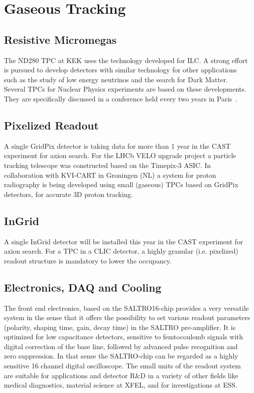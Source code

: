 \section{Gaseous Tracking}
\subsection{Resistive Micromegas}
The ND280 TPC at KEK uses the technology developed for ILC.
A strong effort is pursued to develop detectors with similar technology for other applications such as
the study of low energy neutrinos and the search for Dark Matter.
Several TPCs for Nuclear Physics experiments are based on these developments. They are specifically discussed in a
conference held every two years in Paris~\cite{Irastorza:2013mxa}.

\subsection{Pixelized Readout}
A single GridPix detector is taking data for more than 1 year in the CAST
experiment for axion search.
For the LHCb VELO upgrade project a particle tracking telescope was constructed
based on the Timepix-3 ASIC.
In collaboration with KVI-CART in Groningen (NL) a system for proton radiography
is being developed using small (gaseous) TPCs based on GridPix detectors, for
accurate 3D proton tracking.

\subsection{InGrid}
A single InGrid detector will be installed this year in the CAST experiment for axion search. For a TPC in a CLIC detector, a highly granular (i.e. pixelized) readout structure is mandatory to lower the occupancy.

\subsection{Electronics, DAQ and Cooling}
The front end electronics, based on the SALTRO16-chip provides a very versatile system in the sense that it offers the possibility to set various readout parameters (polarity, shaping time, gain, decay time) in the SALTRO pre-amplifier. It is optimized for low capacitance detectors, sensitive to femtocoulomb signals with digital correction of the base line, followed by advanced pulse recognition and zero suppression.  In that sense the SALTRO-chip can be regarded as a highly sensitive 16 channel digital oscilloscope. The small units of the readout system are suitable for applications and detector R\&D in a variety of other fields like medical diagnostics, material science at XFEL, and for investigations at ESS.

